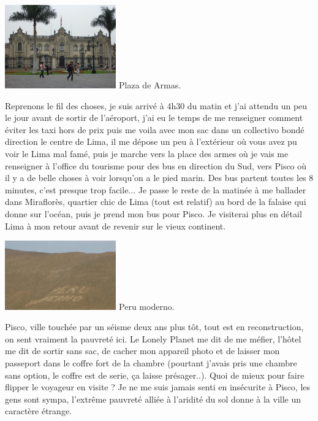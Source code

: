\begin{multicols}{2}
\hspace*{-0.65cm}
\includegraphics[width=4.8cm]{articles/Cote-du-sud/1255996660JAoN.jpg}
Plaza de Armas.

Reprenons le fil des choses, je suis arrivé à 4h30 du matin et j'ai attendu un peu le jour avant de sortir de l'aéroport, j'ai eu le temps de me renseigner comment éviter les taxi hors de prix puis me voila avec mon sac dans un collectivo bondé direction le centre de Lima, il me dépose un peu  à l'extérieur où vous avez pu voir le Lima mal famé, puis je marche vers la place des armes où je vais me renseigner à l'office du tourisme pour des bus en direction du Sud, vers Pisco où il y a de belle choses à voir lorsqu'on a le pied marin. Des bus partent toutes les 8 minutes, c'est presque trop facile... Je passe le reste de la matinée à me ballader dans Miraflorès, quartier chic de Lima (tout est relatif) au bord de la falaise qui donne sur l'océan, puis je prend mon bus pour Pisco. Je visiterai plus en détail Lima à mon retour avant de revenir sur le vieux continent.

\hspace*{-0.65cm}
\includegraphics[width=4.8cm]{articles/Cote-du-sud/1255996643RUpx.jpg}
Peru moderno.


Pisco, ville touchée par un séisme deux ans plus tôt, tout est en reconstruction, on sent vraiment la pauvreté ici. Le Lonely Planet me dit de me méfier, l'hôtel me dit de sortir sans sac, de cacher mon appareil photo et de laisser mon passeport dans le coffre fort de la chambre (pourtant j'avais pris une chambre sans option, le coffre est de serie, ça laisse présager..). Quoi de mieux pour faire flipper le voyageur en visite ? Je ne me suis jamais senti en insécurite à Pisco, les gens sont sympa, l'extrême pauvreté alliée à l'aridité du sol donne à la ville un caractère étrange.


\end{multicols}
